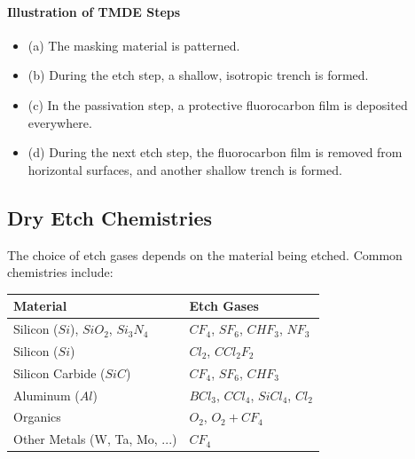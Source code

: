 \documentclass{report}
\begin{document}
\paragraph{Illustration of TMDE Steps}
\begin{itemize}
    \item (a) The masking material is patterned.
    \item (b) During the etch step, a shallow, isotropic trench is formed.
    \item (c) In the passivation step, a protective fluorocarbon film is deposited everywhere.
    \item (d) During the next etch step, the fluorocarbon film is removed from horizontal surfaces, and another shallow trench is formed.
\end{itemize}

\subsection{Dry Etch Chemistries}
The choice of etch gases depends on the material being etched. Common chemistries include:
\begin{center}
    \begin{tabular}{|l|l|}
        \hline
        \textbf{Material} & \textbf{Etch Gases} \\
        \hline
        Silicon ($Si$), $SiO_{2}$, $Si_{3}N_{4}$ & $CF_{4}$, $SF_{6}$, $CHF_{3}$, $NF_{3}$ \\
        Silicon ($Si$) & $Cl_{2}$, $CCl_{2}F_{2}$ \\
        Silicon Carbide ($SiC$) & $CF_{4}$, $SF_{6}$, $CHF_{3}$ \\
        Aluminum ($Al$) & $BCl_{3}$, $CCl_{4}$, $SiCl_{4}$, $Cl_{2}$ \\
        Organics & $O_{2}$, $O_{2} + CF_{4}$ \\
        Other Metals (W, Ta, Mo, ...) & $CF_{4}$ \\
        \hline
    \end{tabular}
\end{center}
\end{document}
